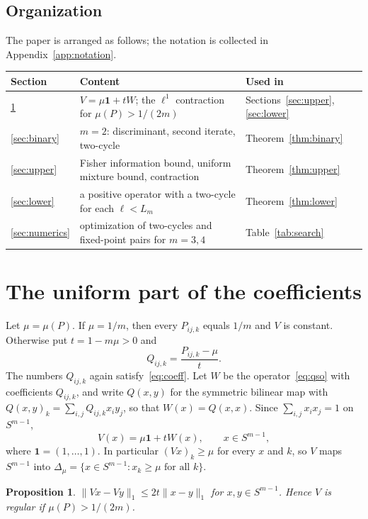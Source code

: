 \documentclass[11pt]{amsart}
\newtheorem{proposition}[theorem]{Proposition}
\theoremstyle{definition}
\theoremstyle{remark}
\newcommand{\one}{\mathbf{1}}
\begin{document}
\subsection*{Organization}
The paper is arranged as follows; the notation is collected in Appendix~\ref{app:notation}.
\begin{center}
\begin{tabular}{lll}
\toprule
Section & Content & Used in\\
\midrule
\ref{sec:prelim} & $V=\mu\one+tW$; the $\ell^1$ contraction for $\mu(P)>1/(2m)$ & Sections~\ref{sec:upper}, \ref{sec:lower}\\
\ref{sec:binary} & $m=2$: discriminant, second iterate, two-cycle & Theorem~\ref{thm:binary}\\
\ref{sec:upper} & Fisher information bound, uniform mixture bound, contraction & Theorem~\ref{thm:upper}\\
\ref{sec:lower} & a positive operator with a two-cycle for each $\ell<L_m$ & Theorem~\ref{thm:lower}\\
\ref{sec:numerics} & optimization of two-cycles and fixed-point pairs for $m=3,4$ & Table~\ref{tab:search}\\
\bottomrule
\end{tabular}
\end{center}

\section{The uniform part of the coefficients}\label{sec:prelim}

Let $\mu=\mu(P)$. If $\mu=1/m$, then every $P_{ij,k}$ equals $1/m$ and $V$ is constant. Otherwise put $t=1-m\mu>0$ and
\[
Q_{ij,k}=\frac{P_{ij,k}-\mu}{t}.
\]
The numbers $Q_{ij,k}$ again satisfy~\eqref{eq:coeff}. Let $W$ be the operator~\eqref{eq:qso} with coefficients
$Q_{ij,k}$, and write $Q(x,y)$ for the symmetric bilinear map with $Q(x,y)_k=\sum_{i,j}Q_{ij,k}x_iy_j$, so that
$W(x)=Q(x,x)$. Since $\sum_{i,j}x_ix_j=1$ on $S^{m-1}$,
\begin{equation}\label{eq:split}
V(x)=\mu\one+tW(x),\qquad x\in S^{m-1},
\end{equation}
where $\one=(1,\dots,1)$. In particular $(Vx)_k\ge\mu$ for every $x$ and $k$, so $V$ maps $S^{m-1}$ into
$\Delta_\mu=\{x\in S^{m-1}:x_k\ge\mu\text{ for all }k\}$.

\begin{proposition}\label{prop:l1}
$\|Vx-Vy\|_1\le2t\|x-y\|_1$ for $x,y\in S^{m-1}$. Hence $V$ is regular if $\mu(P)>1/(2m)$.
\end{proposition}
\end{document}
